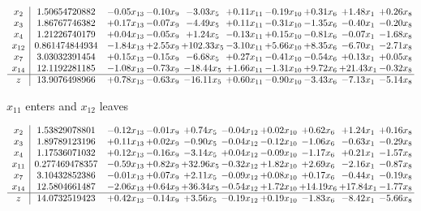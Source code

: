 \documentclass[9pt]{article}
\begin{document}
 \[\begin{array}{c| c c@{\hskip 2pt} c@{\hskip 2pt} c@{\hskip 2pt} c@{\hskip 2pt} c@{\hskip 2pt} c@{\hskip 2pt} c@{\hskip 2pt} c@{\hskip 2pt} }
 x_{2}   &  1.50654720882 & -0.05 x_{13} & -0.10 x_{9} & -3.03 x_{5} & +  0.11 x_{11} & -0.19 x_{10} & +  0.31 x_{6} & +  1.48 x_{1} & +  0.26 x_{8}\\
 x_{3}   &  1.86767746382 & +  0.17 x_{13} & -0.07 x_{9} & -4.49 x_{5} & +  0.11 x_{11} & -0.31 x_{10} & -1.35 x_{6} & -0.40 x_{1} & -0.20 x_{8}\\
 x_{4}   &  1.21226740179 & +  0.04 x_{13} & -0.05 x_{9} & +  1.24 x_{5} & -0.13 x_{11} & +  0.15 x_{10} & -0.81 x_{6} & -0.07 x_{1} & -1.68 x_{8}\\
 x_{12}   &  0.861474844934 & -1.84 x_{13} & +  2.55 x_{9} & + 102.33 x_{5} & -3.10 x_{11} & +  5.66 x_{10} & +  8.35 x_{6} & -6.70 x_{1} & -2.71 x_{8}\\
 x_{7}   &  3.03032391454 & +  0.15 x_{13} & -0.15 x_{9} & -6.68 x_{5} & +  0.27 x_{11} & -0.41 x_{10} & -0.54 x_{6} & +  0.13 x_{1} & +  0.05 x_{8}\\
 x_{14}   &  12.1192281185 & -1.08 x_{13} & -0.73 x_{9} & -18.44 x_{5} & +  1.66 x_{11} & -1.31 x_{10} & +  9.72 x_{6} & + 21.43 x_{1} & -0.32 x_{8}\\
\hline
z    &  13.9076498966 & +  0.78 x_{13} & -0.63 x_{9} & -16.11 x_{5} & +  0.60 x_{11} & -0.90 x_{10} & -3.43 x_{6} & -7.13 x_{1} & -5.14 x_{8}\\
\end{array}\]


 $ x_{11} $ enters and $ x_{12} $ leaves 

 \[\begin{array}{c| c c@{\hskip 2pt} c@{\hskip 2pt} c@{\hskip 2pt} c@{\hskip 2pt} c@{\hskip 2pt} c@{\hskip 2pt} c@{\hskip 2pt} c@{\hskip 2pt} }
 x_{2}   &  1.53829078801 & -0.12 x_{13} & -0.01 x_{9} & +  0.74 x_{5} & -0.04 x_{12} & +  0.02 x_{10} & +  0.62 x_{6} & +  1.24 x_{1} & +  0.16 x_{8}\\
 x_{3}   &  1.89789123196 & +  0.11 x_{13} & +  0.02 x_{9} & -0.90 x_{5} & -0.04 x_{12} & -0.12 x_{10} & -1.06 x_{6} & -0.63 x_{1} & -0.29 x_{8}\\
 x_{4}   &  1.17536071032 & +  0.12 x_{13} & -0.16 x_{9} & -3.14 x_{5} & +  0.04 x_{12} & -0.09 x_{10} & -1.17 x_{6} & +  0.21 x_{1} & -1.57 x_{8}\\
 x_{11}   &  0.277469478357 & -0.59 x_{13} & +  0.82 x_{9} & + 32.96 x_{5} & -0.32 x_{12} & +  1.82 x_{10} & +  2.69 x_{6} & -2.16 x_{1} & -0.87 x_{8}\\
 x_{7}   &  3.10432852386 & -0.01 x_{13} & +  0.07 x_{9} & +  2.11 x_{5} & -0.09 x_{12} & +  0.08 x_{10} & +  0.17 x_{6} & -0.44 x_{1} & -0.19 x_{8}\\
 x_{14}   &  12.5804661487 & -2.06 x_{13} & +  0.64 x_{9} & + 36.34 x_{5} & -0.54 x_{12} & +  1.72 x_{10} & + 14.19 x_{6} & + 17.84 x_{1} & -1.77 x_{8}\\
\hline
z    &  14.0732519423 & +  0.42 x_{13} & -0.14 x_{9} & +  3.56 x_{5} & -0.19 x_{12} & +  0.19 x_{10} & -1.83 x_{6} & -8.42 x_{1} & -5.66 x_{8}\\
\end{array}\]
\end{document}
